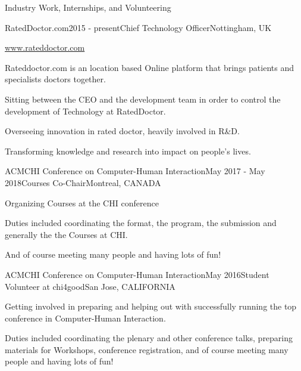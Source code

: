 \documentclass{resume} %
\begin{document}


\begin{rSection}{Industry Work, Internships, and Volunteering}
    \begin{rSubsection}{RatedDoctor.com}{2015 - present}{Chief Technology Officer}{Nottingham, UK}
        \item \url{www.rateddoctor.com}
        \item Rateddoctor.com is an location based Online platform that brings patients and specialists doctors together.
		\item Sitting between the CEO and the development team in order to control the development of Technology at RatedDoctor.
		\item Overseeing innovation in rated doctor,  heavily involved in R\&D.
		\item Transforming knowledge and research into impact on people's lives.
    \end{rSubsection}

	\begin{rSubsection}{ACMCHI Conference on Computer-Human Interaction}{May 2017 - May 2018}{Courses Co-Chair}{Montreal, CANADA}
	\item Organizing Courses at the CHI conference
	\item Duties included coordinating the format, the program, the submission and generally the the Courses at CHI.
	\item And of course meeting many people and having lots of fun!
\end{rSubsection}

\begin{rSubsection}{ACMCHI Conference on Computer-Human Interaction}{May 2016}{Student Volunteer at chi4good}{San Jose, CALIFORNIA}
	\item Getting involved in preparing and helping out with successfully running the top conference in Computer-Human Interaction. 
	\item Duties included coordinating the plenary and other conference talks, preparing materials for Workshops, conference registration, and of course meeting many people and having lots of fun!
\end{rSubsection}


\end{rSection}
\end{document}
